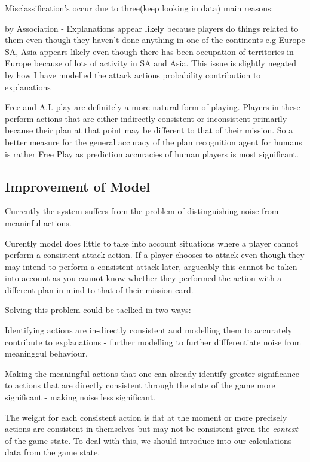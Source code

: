 \documentclass[parskip]{cs4rep}
\begin{document}
Misclassification's occur due to three(keep looking in data) main reasons:

by Association - Explanations appear likely because players do things related to them even though they haven't done anything in one of the continents e.g Europe SA, Asia appears likely even though there has been occupation of territories in Europe because of lots of activity in SA and Asia. This issue is slightly negated by how I have modelled the attack actions probability contribution to explanations

Free and A.I. play are definitely a more natural form of playing. Players in these perform actions that are either indirectly-consistent or inconsistent primarily because their plan at that point may be different to that of their mission. So a better measure for the general accuracy of the plan recognition  agent for humans is rather Free Play as prediction accuracies of human players is most significant.

\subsection{Improvement of Model}

Currently the system suffers from the problem of distinguishing noise from meaninful actions.

Curently model does little to take into account situations where a player cannot perform a consistent attack action. If a player chooses to attack even though they may intend to perform a consistent attack later, argueably this cannot be taken into account as you cannot know whether they performed the action with a different plan in mind to that of their mission card.

Solving this problem could be taclked in two ways:

Identifying actions are in-directly consistent and modelling them to accurately contribute to explanations - further modelling to further diffferentiate noise from meaninggul behaviour.
 
Making the meaningful actions that one can already identify greater significance to actions that are directly consistent through the state of the game  more significant - making noise less significant.

The weight for each consistent action is flat at the moment or more precisely actions are consistent in themselves but may not be consistent given the \textit{context} of the game state. To deal with this, we should introduce into our calculations data from the game state.
\end{document}
